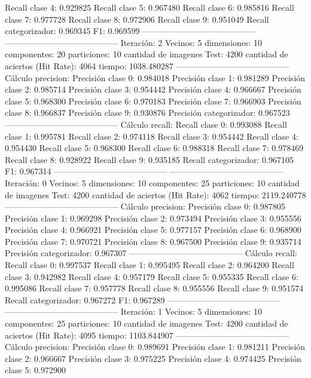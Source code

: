 Recall clase 4: 0.929825
Recall clase 5: 0.967480
Recall clase 6: 0.985816
Recall clase 7: 0.977728
Recall clase 8: 0.972906
Recall clase 9: 0.951049
Recall categorizador: 0.969345
F1: 0.969599
-----------------------------------------
-----------------------------------------
Iteración: 2
Vecinos: 5
dimensiones: 10
componentes: 20
particiones: 10
cantidad de imagenes Test: 4200
cantidad de aciertos (Hit Rate): 4064
tiempo: 1038.480287
-----------------------------------------
Cálculo precision: 
Precisión clase 0: 0.984018
Precisión clase 1: 0.981289
Precisión clase 2: 0.985714
Precisión clase 3: 0.954442
Precisión clase 4: 0.966667
Precisión clase 5: 0.968300
Precisión clase 6: 0.970183
Precisión clase 7: 0.966903
Precisión clase 8: 0.966837
Precisión clase 9: 0.930876
Precisión categorizador: 0.967523
-----------------------------------------
Cálculo recall: 
Recall clase 0: 0.993088
Recall clase 1: 0.995781
Recall clase 2: 0.974118
Recall clase 3: 0.954442
Recall clase 4: 0.954430
Recall clase 5: 0.968300
Recall clase 6: 0.988318
Recall clase 7: 0.978469
Recall clase 8: 0.928922
Recall clase 9: 0.935185
Recall categorizador: 0.967105
F1: 0.967314
-----------------------------------------
-----------------------------------------
Iteración: 0
Vecinos: 5
dimensiones: 10
componentes: 25
particiones: 10
cantidad de imagenes Test: 4200
cantidad de aciertos (Hit Rate): 4062
tiempo: 2119.240778
-----------------------------------------
Cálculo precision: 
Precisión clase 0: 0.987805
Precisión clase 1: 0.969298
Precisión clase 2: 0.973494
Precisión clase 3: 0.955556
Precisión clase 4: 0.966921
Precisión clase 5: 0.977157
Precisión clase 6: 0.968900
Precisión clase 7: 0.970721
Precisión clase 8: 0.967500
Precisión clase 9: 0.935714
Precisión categorizador: 0.967307
-----------------------------------------
Cálculo recall: 
Recall clase 0: 0.997537
Recall clase 1: 0.995495
Recall clase 2: 0.964200
Recall clase 3: 0.942982
Recall clase 4: 0.957179
Recall clase 5: 0.955335
Recall clase 6: 0.995086
Recall clase 7: 0.957778
Recall clase 8: 0.955556
Recall clase 9: 0.951574
Recall categorizador: 0.967272
F1: 0.967289
-----------------------------------------
-----------------------------------------
Iteración: 1
Vecinos: 5
dimensiones: 10
componentes: 25
particiones: 10
cantidad de imagenes Test: 4200
cantidad de aciertos (Hit Rate): 4095
tiempo: 1103.844907
-----------------------------------------
Cálculo precision: 
Precisión clase 0: 0.989691
Precisión clase 1: 0.981211
Precisión clase 2: 0.966667
Precisión clase 3: 0.975225
Precisión clase 4: 0.974425
Precisión clase 5: 0.972900

